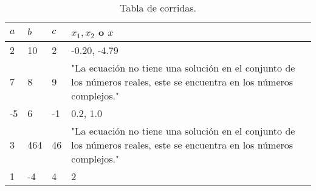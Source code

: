 \begin{table}[!ht]
\label{T:equipos}
\begin{center}
\begin{tabular}{| p{.5cm} | p{.5cm} | p{.5cm} | p{5cm} |}
\hline
\textbf{$a$} & \textbf{$b$} & \textbf{$c$} & \textbf{$x_1, x_2$ o $x$}\\
\hline
2 & 10 & 2 & -0.20, -4.79 \\
7 & 8 & 9 & "La ecuación no tiene una solución en el conjunto de los números reales, este se encuentra en los números complejos." \\
-5 & 6 & -1 & 0.2, 1.0 \\
3 & 464 & 46 & "La ecuación no tiene una solución en el conjunto de los números reales, este se encuentra en los números complejos." \\
1 & -4 & 4 & 2 \\
\hline
\end{tabular}
\caption{Tabla de corridas.}
\end{center}
\end{table}
